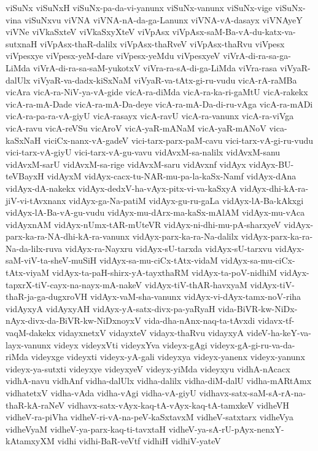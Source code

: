 {viSuNx
viSuNxH
viSuNx-pa-da-vi-yanunx
viSuNx-vanunx
viSuNx-vige
viSuNx-vina
viSuNxvu
viVNA
viVNA-nA-da-ga-Lanunx
viVNA-vA-dasayx
viVNAyeY
viVNe
viVkaSxteV
viVkaSxyXteV
viVpAsx
viVpAsx-saM-Ba-vA-du-katx-va-sutxnaH
viVpAsx-thaR-dalilx
viVpAsx-thaRveV
viVpAsx-thaRvu
viVpesx
viVpesxye
viVpesx-yeM-dare
viVpesx-yeMdu
viVpesxyeV
viVrA-di-ra-sa-ga-LiMda
viVrA-di-ra-sa-saM-yukotxV
viVra-ra-sA-di-ga-LiMda
viVra-rasa
viVyaR-dalUlx
viVyaR-va-dadx-kiSxNaM
viVyaR-va-tAtx-gi-ru-vudu
vicA-rA-raMBa
vicAra
vicA-ra-NiV-ya-vA-gide
vicA-ra-diMda
vicA-ra-ka-ri-gaMtU
vicA-rakekx
vicA-ra-mA-Dade
vicA-ra-mA-Da-deye
vicA-ra-mA-Da-di-ru-vAga
vicA-ra-mADi
vicA-ra-pa-ra-vA-giyU
vicA-rasayx
vicA-ravU
vicA-ra-vanunx
vicA-ra-viVga
vicA-ravu
vicA-reVSu
vicAroV
vicA-yaR-mANaM
vicA-yaR-mANoV
vica-kaSxNaH
viciCx-nanx-vA-gadeV
vici-tarx-parx-paM-cavu
vici-tarx-vA-gi-ru-vudu
vici-tarx-vA-giyU
vici-tarx-vA-gu-vavu
vidAvxM-sa-nalilx
vidAvxM-sanu
vidAvxM-sarU
vidAvxM-sa-rige
vidAvxM-saru
vidAvxnf
vidAyx
vidAyx-BU-teVBayxH
vidAyxM
vidAyx-cacx-tu-NAR-mu-pa-la-kaSx-Namf
vidAyx-dAna
vidAyx-dA-nakekx
vidAyx-dedxV-ha-vAyx-pitx-vi-va-kaSxyA
vidAyx-dhi-kA-ra-jiV-vi-tAvxnanx
vidAyx-ga-Na-patiM
vidAyx-gu-ru-gaLa
vidAyx-lA-Ba-kAkxgi
vidAyx-lA-Ba-vA-gu-vudu
vidAyx-mu-dArx-ma-kaSx-mAlAM
vidAyx-mu-vAca
vidAyxnAM
vidAyx-nUmx-tAR-mUteVR
vidAyx-ni-dhi-mu-pA-sharxyeV
vidAyx-parx-ka-ra-NA-dhi-kA-ra-vanunx
vidAyx-parx-ka-ra-Na-dalilx
vidAyx-parx-ka-ra-Na-da-lilx-ruva
vidAyx-ra-Nayxru
vidAyx-sU-tarxda
vidAyx-sU-tarxvu
vidAyx-saM-viV-ta-sheV-muSiH
vidAyx-sa-mu-ciCx-tAtx-vidaM
vidAyx-sa-mu-ciCx-tAtx-viyaM
vidAyx-ta-paH-shirx-yA-tayxthaRM
vidAyx-ta-poV-nidhiM
vidAyx-tapxrX-tiV-cayx-na-nayx-mA-nakeV
vidAyx-tiV-thAR-havxyaM
vidAyx-tiV-thaR-ja-ga-dugxroVH
vidAyx-vaM-sha-vanunx
vidAyx-vi-dAyx-tamx-noV-riha
vidAyxyA
vidAyxyAH
vidAyx-yA-satx-divx-pa-yaRyaH
vida-BiVR-kw-NiDx-nAyx-divx-da-BiVR-kw-NiDxnoyxV
vida-dha-nAnx-naq-ta-tAvxdi
vidavx-tf-vaqM-dakekx
vidayxnetxV
vidayxteV
vidayx-thaRvu
vidayxyA
videV-ha-keY-va-layx-vanunx
videyx
videyxVti
videyxYva
videyx-gAgi
videyx-gA-gi-ru-va-da-riMda
videyxge
videyxti
videyx-yA-gali
videyxya
videyx-yanenx
videyx-yanunx
videyx-ya-sutxti
videyxye
videyxyeV
videyx-yiMda
videyxyu
vidhA-nAcacx
vidhA-navu
vidhAnf
vidha-dalUlx
vidha-dalilx
vidha-diM-dalU
vidha-mARtAmx
vidhatetxV
vidha-vAda
vidha-vAgi
vidha-vA-giyU
vidhavx-satx-saM-sA-rA-na-thaR-kA-raNeV
vidhavx-satx-vAyx-kaq-tA-vAyx-kaq-tA-tamxkeV
vidheVH
vidheV-ra-piVha
vidheV-ri-vA-na-peV-kaSxtavxM
vidheV-satxtarx
vidheVya
vidheVyaM
vidheV-ya-parx-kaq-ti-tavxtaH
vidheV-ya-sA-rU-pAyx-nenxY-kAtamxyXM
vidhi
vidhi-BaR-veVtf
vidhiH
vidhiV-yateV
}
